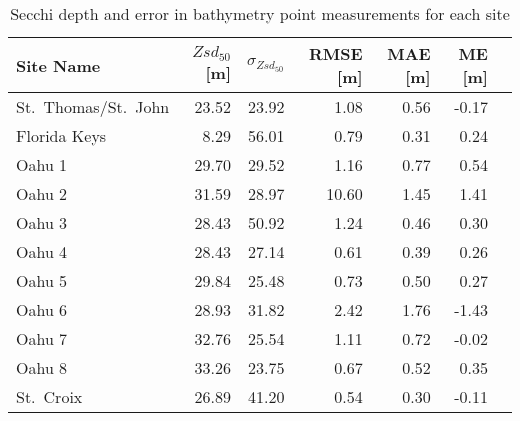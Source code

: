 \begin{table}
    \centering
    \caption{Secchi depth and error in bathymetry point measurements for each site}
    \label{tab:ocean_color_summary_by_site}
    \begin{tabular}{lrrrrrr}
        \toprule
        {}
        Site Name           & $Zsd_{50}$[m] & $\sigma_{Zsd_{50}}$ & RMSE [m] & MAE [m] & ME [m] \\
        \midrule
        St.~Thomas/St.~John & 23.52         & 23.92               & 1.08          & 0.56    & -0.17  \\
        Florida Keys        & 8.29          & 56.01               & 0.79          & 0.31    & 0.24   \\
        Oahu 1              & 29.70         & 29.52               & 1.16          & 0.77    & 0.54   \\
        Oahu 2              & 31.59         & 28.97               & 10.60         & 1.45    & 1.41   \\
        Oahu 3              & 28.43         & 50.92               & 1.24          & 0.46    & 0.30   \\
        Oahu 4              & 28.43         & 27.14               & 0.61          & 0.39    & 0.26   \\
        Oahu 5              & 29.84         & 25.48               & 0.73          & 0.50    & 0.27   \\
        Oahu 6              & 28.93         & 31.82               & 2.42          & 1.76    & -1.43  \\
        Oahu 7              & 32.76         & 25.54               & 1.11          & 0.72    & -0.02  \\
        Oahu 8              & 33.26         & 23.75               & 0.67          & 0.52    & 0.35   \\
        St.~Croix           & 26.89         & 41.20               & 0.54          & 0.30    & -0.11  \\
        \bottomrule
    \end{tabular}
\end{table}
